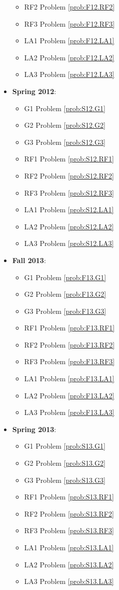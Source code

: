 \documentclass{article}
\theoremstyle{definition}
\begin{document}
\begin{itemize}
\begin{itemize}
	\item RF2 Problem \ref{prob:F12.RF2}
	\item RF3 Problem \ref{prob:F12.RF3}
	\item LA1 Problem \ref{prob:F12.LA1}
	\item LA2 Problem \ref{prob:F12.LA2}
	\item LA3 Problem \ref{prob:F12.LA3}	
	\end{itemize}
\item \textbf{Spring 2012}:  
	\begin{itemize}
	\item G1 Problem \ref{prob:S12.G1} 
	\item G2 Problem \ref{prob:S12.G2} 
	\item G3 Problem \ref{prob:S12.G3}
	\item RF1 Problem \ref{prob:S12.RF1}
	\item RF2 Problem \ref{prob:S12.RF2}
	\item RF3 Problem \ref{prob:S12.RF3}
	\item LA1 Problem \ref{prob:S12.LA1}
	\item LA2 Problem \ref{prob:S12.LA2}
	\item LA3 Problem \ref{prob:S12.LA3}
	\end{itemize}	
	
\item \textbf{Fall 2013}:  
	\begin{itemize}
	\item G1 Problem \ref{prob:F13.G1} 
	\item G2 Problem \ref{prob:F13.G2} 
	\item G3 Problem \ref{prob:F13.G3}
	\item RF1 Problem \ref{prob:F13.RF1}
	\item RF2 Problem \ref{prob:F13.RF2}
	\item RF3 Problem \ref{prob:F13.RF3}
	\item LA1 Problem \ref{prob:F13.LA1}
	\item LA2 Problem \ref{prob:F13.LA2}
	\item LA3 Problem \ref{prob:F13.LA3}
	\end{itemize}

\item \textbf{Spring 2013}:  
	\begin{itemize}
	\item G1 Problem \ref{prob:S13.G1} 
	\item G2 Problem \ref{prob:S13.G2} 
	\item G3 Problem \ref{prob:S13.G3}
	\item RF1 Problem \ref{prob:S13.RF1}
	\item RF2 Problem \ref{prob:S13.RF2}
	\item RF3 Problem \ref{prob:S13.RF3}
	\item LA1 Problem \ref{prob:S13.LA1}
	\item LA2 Problem \ref{prob:S13.LA2}
	\item LA3 Problem \ref{prob:S13.LA3}
	\end{itemize}
	

\end{itemize}
\end{document}
